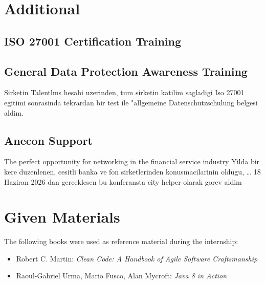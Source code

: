 \section{Additional}
\subsection*{ISO 27001 Certification Training}
 
\subsection*{General Data Protection Awareness Training}
Sirketin Talentlms hesabi uzerinden, tum sirketin katilim sagladigi Iso 27001 egitimi sonrasinda tekrardan bir test ile "allgemeine Datenschutzschulung belgesi aldim. 
\subsection*{Anecon Support}
The perfect opportunity for networking in the financial service industry
Yilda bir kere duzenlenen, cesitli banka ve fon sirketlerinden konusmacilarinin oldugu, \dots
18 Haziran 2026 dan gerceklesen bu konferansta city helper olarak gorev aldim 

\section{Given Materials}
The following books were used as reference material during the internship:


\begin{itemize}
    \item Robert C. Martin: \textit{Clean Code: A Handbook of Agile Software Craftsmanship}
    \item Raoul-Gabriel Urma, Mario Fusco, Alan Mycroft: \textit{Java 8 in Action}
\end{itemize}
